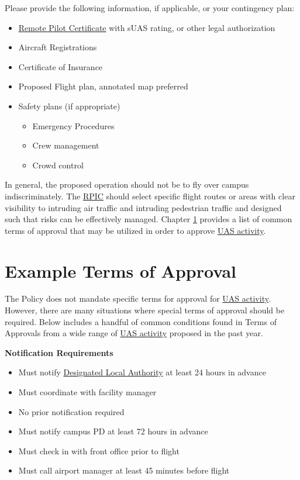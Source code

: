 \documentclass[
]{book}
\providecommand{\tightlist}{%
  \setlength{\itemsep}{0pt}\setlength{\parskip}{0pt}}
\begin{document}
Please provide the following information, if applicable, or your contingency plan:

\begin{itemize}
\item
  \protect\hyperlink{RPC}{Remote Pilot Certificate} with sUAS rating, or other legal authorization
\item
  Aircraft Registrations
\item
  Certificate of Insurance
\item
  Proposed Flight plan, annotated map preferred
\item
  Safety plans (if appropriate)

  \begin{itemize}
  \tightlist
  \item
    Emergency Procedures
  \item
    Crew management
  \item
    Crowd control
  \end{itemize}
\end{itemize}

In general, the proposed operation should not be to fly over campus indiscriminately. The \protect\hyperlink{RPIC}{RPIC} should select specific flight routes or areas with clear visibility to intruding air traffic and intruding pedestrian traffic and designed such that risks can be effectively managed. Chapter \ref{ch-example-terms} provides a list of common terms of approval that may be utilized in order to approve \protect\hyperlink{UASactivity}{UAS activity}.

\hypertarget{ch-example-terms}{%
\chapter{Example Terms of Approval}\label{ch-example-terms}}

The Policy does not mandate specific terms for approval for \protect\hyperlink{UASactivity}{UAS activity}. However, there are many situations where special terms of approval should be required. Below includes a handful of common conditions found in Terms of Approvals from a wide range of \protect\hyperlink{UASactivity}{UAS activity} proposed in the past year.

\textbf{Notification Requirements}

\begin{itemize}
\tightlist
\item
  Must notify \protect\hyperlink{DLA}{Designated Local Authority} at least 24 hours in advance
\item
  Must coordinate with facility manager
\item
  No prior notification required
\item
  Must notify campus PD at least 72 hours in advance
\item
  Must check in with front office prior to flight
\item
  Must call airport manager at least 45 minutes before flight
\end{itemize}
\end{document}
